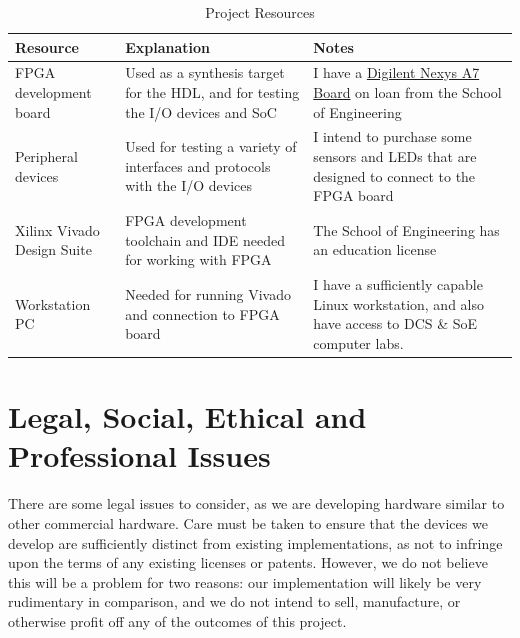 \documentclass[a4paper,fleqn,12pt]{article}
\begin{document}
\begin{table}[h!]
    \centering
    \begin{tabular}{|p{}|p{}|p{}|}
        \hline
        \textbf{Resource}          & \textbf{Explanation}                                                            & \textbf{Notes}                                                                                                                                   \\ \hline
        FPGA development board     & Used as a synthesis target for the HDL, and for testing the I/O devices and SoC & I have a \href{https://digilent.com/reference/programmable-logic/nexys-a7/start}{Digilent Nexys A7 Board} on loan from the School of Engineering \\ \hline
        Peripheral devices         & Used for testing a variety of interfaces and protocols with the I/O devices     & I intend to purchase some sensors and LEDs that are designed to connect to the FPGA board                                                        \\ \hline
        Xilinx Vivado Design Suite & FPGA development toolchain and IDE needed for working with FPGA                 & The School of Engineering has an education license                                                                                               \\ \hline
        Workstation PC             & Needed for running Vivado and connection to FPGA board                          & I have a sufficiently capable Linux workstation, and also have access to DCS \& SoE computer labs.                                               \\ \hline
    \end{tabular}
    \caption{Project Resources}
    \label{tab:resources}
\end{table}


\section{Legal, Social, Ethical and Professional Issues}

There are some legal issues to consider, as we are developing hardware similar to other commercial hardware. Care must be taken to ensure that the devices we develop are sufficiently distinct from existing implementations, as not to infringe upon the terms of any existing licenses or patents. However, we do not believe this will be a problem for two reasons: our implementation will likely be very rudimentary in comparison, and we do not intend to sell, manufacture, or otherwise profit off any of the outcomes of this project.
\end{document}
